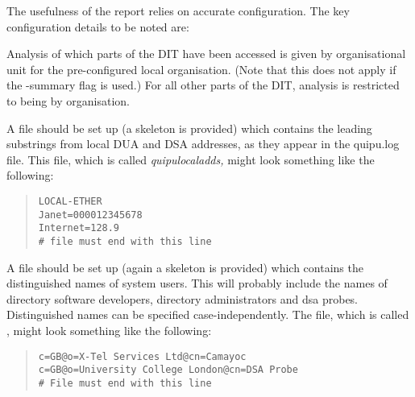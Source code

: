 The usefulness of the report relies on accurate configuration.  The key
configuration details to be noted are:

\begin{describe}
\item [\verb+Local Organisation+:] Analysis of which parts of the DIT have been
accessed is given by organisational unit for the pre-configured local
organisation.  (Note that this does not apply if the -summary flag
is used.)  For all other parts of the DIT, analysis is restricted to
being by organisation.  

\item [\verb+Local addresses+:] A file should be set up (a skeleton is provided)
which contains the leading
substrings from local DUA and DSA addresses, as they appear in the quipu.log
file.  This file, which is called {\em quipulocaladds,} might look something
like the following:

\begin{quote}\small\begin{verbatim}
LOCAL-ETHER
Janet=000012345678
Internet=128.9
# file must end with this line
\end{verbatim}\end{quote}

\item [\verb+Filtering out system usage+:] A file should be set up (again a skeleton
is provided) which contains the distinguished names of system users.  This
will probably include the names of directory software developers,
directory administrators and dsa probes.  Distinguished names can be
specified case-independently.  The file, which is called 
,
might look something like the following:

\begin{quote}\footnotesize\begin{verbatim}
c=GB@o=X-Tel Services Ltd@cn=Camayoc
c=GB@o=University College London@cn=DSA Probe
# File must end with this line

\end{verbatim}\end{quote}

\end{describe}

